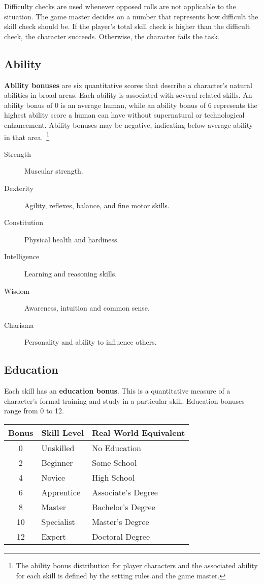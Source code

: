 \documentclass[11pt]{article}
\begin{document}
Difficulty checks are used whenever opposed rolls are not applicable to the situation.
The game master decides on a number that represents how difficult the skill check should be.
If the player's total skill check is higher than the difficult check, the character succeeds.
Otherwise, the character fails the task.

\subsection{Ability}
\textbf{Ability bonuses} are six quantitative scores that describe a character's natural abilities in broad areas.
Each ability is associated with several related skills. An ability bonus of 0 is an average human, while an ability bonus of 6 represents the highest ability score a human can have without supernatural or technological enhancement.
Ability bonuses may be negative, indicating below-average ability in that area.\
\footnote{The ability bonus distribution for player characters and the associated ability for each skill is defined by the setting rules and the game master.}

\begin{description}
	\item[Strength]Muscular strength.
	\item[Dexterity]Agility, reflexes, balance, and fine motor skills.
	\item[Constitution]Physical health and hardiness.
	\item[Intelligence]Learning and reasoning skills.
	\item[Wisdom]Awareness, intuition and common sense.
	\item[Charisma]Personality and ability to influence others.
\end{description}

\subsection{Education}
Each skill has an \textbf{education bonus}.
This is a quantitative measure of a character's formal training and study in a particular skill.
Education bonuses range from 0 to 12.

\begin{center}
	\begin{tabular}{cll}
		Bonus & Skill Level & Real World Equivalent  \\
		\hline
		0     & Unskilled   & No Education           \\
		2     & Beginner    & Some School            \\
		4     & Novice      & High School            \\
		6     & Apprentice  & Associate's Degree     \\
		8     & Master      & Bachelor's Degree      \\
		10    & Specialist  & Master's Degree        \\
		12    & Expert      & Doctoral Degree        \\
	\end{tabular}
\end{center}
\end{document}
